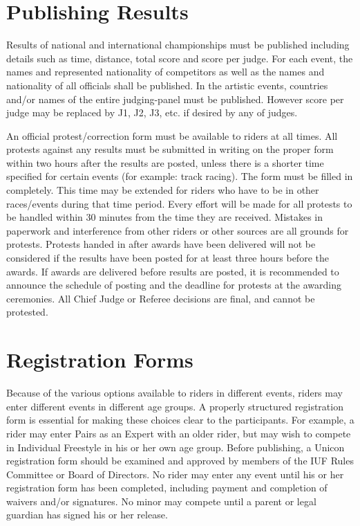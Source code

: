 \section{Publishing Results}
Results of national and international championships must be published including details such as time, distance, total score and score per judge.
For each event, the names and represented nationality of competitors as well as the names and nationality of all officials shall be published.
In the artistic events, countries and/or names of the entire judging-panel must be published.
However score per judge may be replaced by J1, J2, J3, etc.
if desired by any of judges.

An official protest/correction form must be available to riders at all times.
All protests against any results must be submitted in writing on the proper form within two hours after the results are posted, unless there is a shorter time specified for certain events (for example: track racing).
The form must be filled in completely.
This time may be extended for riders who have to be in other races/events during that time period.
Every effort will be made for all protests to be handled within 30 minutes from the time they are received.
Mistakes in paperwork and interference from other riders or other sources are all grounds for protests.
Protests handed in after awards have been delivered will not be considered if the results have been posted for at least three hours before the awards.
If awards are delivered before results are posted, it is recommended to announce the schedule of posting and the deadline for protests at the awarding ceremonies.
All Chief Judge or Referee decisions are final, and cannot be protested.

\section{Registration Forms}
Because of the various options available to riders in different events, riders may enter different events in different age groups.
A properly structured registration form is essential for making these choices clear to the participants.
For example, a rider may enter Pairs as an Expert with an older rider, but may wish to compete in Individual Freestyle in his or her own age group.
Before publishing, a Unicon registration form should be examined and approved by members of the IUF Rules Committee or Board of Directors.
No rider may enter any event until his or her registration form has been completed, including payment and completion of waivers and/or signatures.
No minor may compete until a parent or legal guardian has signed his or her release.

